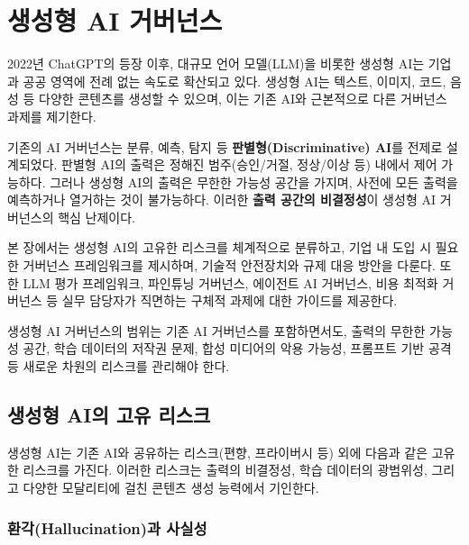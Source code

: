 
\chapter{생성형 AI 거버넌스}
\label{ch:generative_ai_governance}

2022년 ChatGPT의 등장 이후, 대규모 언어 모델(LLM)을 비롯한 생성형 AI는 기업과 공공 영역에 전례 없는 속도로 확산되고 있다. 생성형 AI는 텍스트, 이미지, 코드, 음성 등 다양한 콘텐츠를 생성할 수 있으며, 이는 기존 AI와 근본적으로 다른 거버넌스 과제를 제기한다.

기존의 AI 거버넌스는 분류, 예측, 탐지 등 \textbf{판별형(Discriminative) AI}를 전제로 설계되었다. 판별형 AI의 출력은 정해진 범주(승인/거절, 정상/이상 등) 내에서 제어 가능하다. 그러나 생성형 AI의 출력은 무한한 가능성 공간을 가지며, 사전에 모든 출력을 예측하거나 열거하는 것이 불가능하다. 이러한 \textbf{출력 공간의 비결정성}이 생성형 AI 거버넌스의 핵심 난제이다.

본 장에서는 생성형 AI의 고유한 리스크를 체계적으로 분류하고, 기업 내 도입 시 필요한 거버넌스 프레임워크를 제시하며, 기술적 안전장치와 규제 대응 방안을 다룬다. 또한 LLM 평가 프레임워크, 파인튜닝 거버넌스, 에이전트\cite{wei2022emergent} AI 거버넌스, 비용 최적화 거버넌스 등 실무 담당자가 직면하는 구체적 과제에 대한 가이드를 제공한다.

생성형 AI 거버넌스의 범위는 기존 AI 거버넌스를 포함하면서도, 출력의 무한한 가능성 공간, 학습 데이터의 저작권\cite{bommasani2021opportunities} 문제, 합성 미디어의 악용 가능성, 프롬프트 기반 공격 등 새로운 차원의 리스크를 관리해야 한다.

\section{생성형 AI의 고유 리스크}
\label{sec:gen.1}

생성형 AI는 기존 AI와 공유하는 리스크(편향, 프라이버시 등) 외에 다음과 같은 고유한 리스크를 가진다. 이러한 리스크는 출력의 비결정성, 학습 데이터의 광범위성, 그리고 다양한 모달리티에 걸친 콘텐츠 생성 능력에서 기인한다.

\subsection{환각(Hallucination)과 사실성}
\label{sec:gen.1.1}


